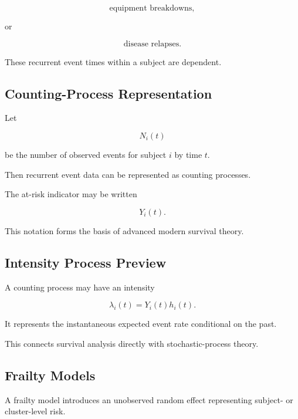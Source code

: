 \[
\boxed{
\text{equipment breakdowns},
}
\]

or

\[
\boxed{
\text{disease relapses}.
}
\]

These recurrent event times within a subject are dependent.

\subsection{Counting-Process Representation}
\label{subsec:counting-process-survival}

Let

\[
N_i(t)
\]

be the number of observed events for subject \(i\) by time \(t\).

Then recurrent event data can be represented as counting processes.

The at-risk indicator may be written

\[
\boxed{
Y_i(t).
}
\]

This notation forms the basis of advanced modern survival theory.

\subsection{Intensity Process Preview}
\label{subsec:survival-intensity-process}

A counting process may have an intensity

\[
\boxed{
\lambda_i(t)
=
Y_i(t)
h_i(t).
}
\]

It represents the instantaneous expected event rate conditional on the
past.

This connects survival analysis directly with stochastic-process theory.

\subsection{Frailty Models}
\label{subsec:frailty-models}

A frailty model introduces an unobserved random effect representing
subject- or cluster-level risk.

